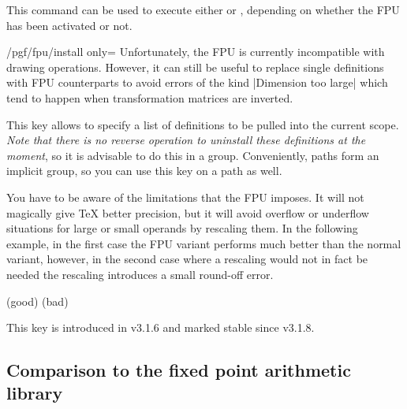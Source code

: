 \begin{command}{\pgflibraryfpuifactive{}}
    This command can be used to execute either  or
    , depending on whether the FPU has been activated or not.
\end{command}

\begin{key}{/pgf/fpu/install only=}
    \label{fpu-install-only}
    Unfortunately, the FPU is currently incompatible with drawing operations.
    However, it can still be useful to replace single definitions with FPU
    counterparts to avoid errors of the kind |Dimension too large| which tend
    to happen when transformation matrices are inverted.

    This key allows to specify a list of definitions to be pulled into the
    current scope.  \emph{Note that there is no reverse operation to uninstall
    these definitions at the moment}, so it is advisable to do this in a group.
    Conveniently, \tikzname{} paths form an implicit group, so you can use this
    key on a path as well.

    You have to be aware of the limitations that the FPU imposes.  It will not
    magically give \TeX{} better precision, but it will avoid overflow or
    underflow situations for large or small operands by rescaling them.  In the
    following example, in the first case the FPU variant performs much better
    than the normal variant, however, in the second case where a rescaling
    would not in fact be needed the rescaling introduces a small round-off
    error.
\begin{codeexample}[
    preamble={\usepgflibrary{fpu}},
    pre={\pgfkeys{/pgf/fpu=false}},
]
\begingroup
{}
\pgfmathresult (good)
\pgfmathresult (bad)
\endgroup
\end{codeexample}
    This key is introduced in \pgfname v3.1.6 and marked stable since \pgfname
    v3.1.8.
\end{key}


\subsection{Comparison to the fixed point arithmetic library}


